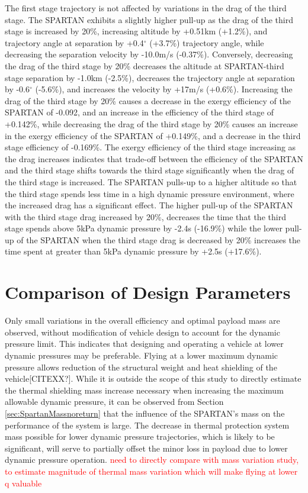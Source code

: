 The first stage trajectory is not affected by variations in the drag of the third stage. 
The SPARTAN exhibits a slightly higher pull-up as the drag of the third stage is increased by 20\%, increasing altitude by +0.51km (+1.2\%), and trajectory angle at separation by +0.4$^\circ$ (+3.7\%) trajectory angle, while decreasing the separation velocity by -10.0m/s (-0.37\%). Conversely, decreasing the drag of the third stage by 20\% decreases the altitude at SPARTAN-third stage separation by -1.0km (-2.5\%), decreases the trajectory angle at separation by -0.6$^\circ$ (-5.6\%), and increases the velocity by +17m/s (+0.6\%). 
Increasing the drag of the third stage by 20\% causes a decrease in the exergy efficiency of the SPARTAN of -0.092, and an increase in the efficiency of the third stage of +0.142\%, while decreasing the drag of the third stage by 20\% causes an increase in the exergy efficiency of the SPARTAN of +0.149\%, and a decrease in the third stage efficiency of -0.169\%. The exergy efficiency of the third stage increasing as the drag increases indicates that trade-off between the efficiency of the SPARTAN and the third stage shifts towards the third stage significantly when the drag of the third stage is increased. The SPARTAN pulls-up to a higher altitude so that the third stage spends less time in a high dynamic pressure environment, where the increased drag has a significant effect. The higher pull-up of the SPARTAN with the third stage drag increased by 20\%, decreases the time that the third stage spends above 5kPa dynamic pressure by -2.4s (-16.9\%) while the lower pull-up of the SPARTAN when the third stage drag is decreased by 20\% increases the time spent at greater than 5kPa dynamic pressure by +2.5s (+17.6\%).

\section{Comparison of Design Parameters}


Only small variations in the overall efficiency and optimal payload mass are observed, without modification of vehicle design to account for the dynamic pressure limit. This indicates that designing and operating a vehicle at lower dynamic pressures may be preferable. Flying at a lower maximum dynamic pressure allows reduction of the structural weight and heat shielding of the vehicle[CITEXX?]. 
While it is outside the scope of this study to directly estimate the thermal shielding mass increase necessary when increasing the maximum allowable dynamic pressure, it can be observed from Section \ref{sec:SpartanMassnoreturn} that the influence of the SPARTAN's mass on the performance of the system is large. The decrease in thermal protection system mass possible for lower dynamic pressure trajectories, which is likely to be significant, will serve to partially offset the minor loss in payload due to lower dynamic pressure operation. 
\textcolor{red}{need to directly compare with mass variation study, to estimate magnitude of thermal mass variation which will make flying at lower q valuable}


